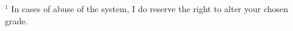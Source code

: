 \documentclass[12pt,letterpaper]{exam}
\begin{document}


$^1$ In cases of abuse of the system, I do reserve the right to alter your chosen grade.   




\end{document}
